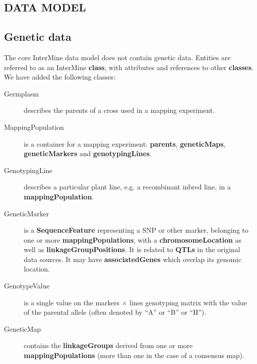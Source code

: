 \documentclass[]{pagposter}
\begin{document}
\begin{multicols*}{3}
  \color{Black}


  \section*{DATA MODEL}

  \subsection*{Genetic data}

  The core InterMine data model does not contain genetic data. Entities are referred to as an InterMine \textbf{class}, with attributes and references to other \textbf{classes}. We have added the following classes:

  \begin{description}

    \item[Germplasm] describes the parents of a cross used in a mapping experiment.

    \item[MappingPopulation] is a container for a mapping experiment: \textbf{parents}, \textbf{geneticMaps}, \textbf{geneticMarkers} and \textbf{genotypingLines}.
      
    \item[GenotypingLine] describes a particular plant line, e.g. a recombinant inbred line, in a \textbf{mappingPopulation}.
      
    \item[GeneticMarker] is a \textbf{SequenceFeature} representing a SNP or other marker, belonging to one or more \textbf{mappingPopulations},
      with a \textbf{chromosomeLocation} as well as \textbf{linkageGroupPositions}.
      It is related to \textbf{QTLs} in the original data sources. It may have \textbf{associatedGenes} which overlap its genomic location.
      
    \item[GenotypeValue] is a single value on the markers $\times$ lines genotyping matrix with the value of the parental allele (often denoted by ``A'' or ``B'' or ``H'').
      
    \item[GeneticMap] contains the \textbf{linkageGroups} derived from one or more \textbf{mappingPopulations} (more than one in the case of a consensus map).
      

\end{description}
\end{multicols*}
\end{document}
